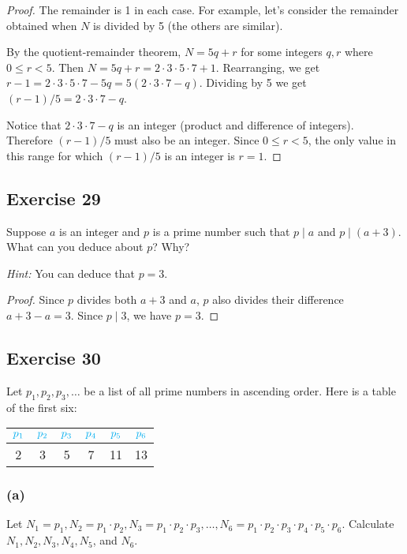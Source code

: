 \documentclass[14pt]{extarticle}
\newcommand{\cy}{\color{cyan}}
\begin{document}
\begin{proof}
The remainder is 1 in each case. For example, let's consider the remainder obtained when $N$ is divided by 5 (the others are similar). 

By the quotient-remainder theorem, $N = 5q+r$ for some integers $q,r$ where $0 \leq r < 5$. Then $N = 5q+r = 2\cdot3\cdot5\cdot7 + 1$. Rearranging, we get $r - 1 = 2\cdot3\cdot5\cdot7 - 5q = 5(2\cdot3\cdot7 - q)$. Dividing by 5 we get $(r-1)/5 = 2\cdot3\cdot7 - q$. 

Notice that $2\cdot3\cdot7 - q$ is an integer (product and difference of integers). Therefore $(r-1)/5$ must also be an integer. Since $0 \leq r < 5$, the only value in this range for which $(r-1)/5$ is an integer is $r = 1$.
\end{proof}

\subsection{Exercise 29}
Suppose $a$ is an integer and $p$ is a prime number such that $p \mid a$ and $p \mid (a + 3)$. What can you deduce
about $p$? Why?

{\it Hint:} You can deduce that $p = 3$.

\begin{proof}
Since $p$ divides both $a+3$ and $a$, $p$ also divides their difference $a+3 - a = 3$. Since $p \mid 3$, we have $p = 3$.
\end{proof}

\subsection{Exercise 30}
Let $p_1, p_2, p_3, \ldots$ be a list of all prime numbers in ascending order. Here is a table of the first six:

\begin{center}
\begin{tabular}{|c|c|c|c|c|c|}
\hline
$\cy p_1$ & $\cy p_2$ & $\cy p_3$ & $\cy p_4$ & $\cy p_5$ & $\cy p_6$\\
\hline
2 & 3 & 5 & 7 & 11 & 13 \\
\hline
\end{tabular}
\end{center}

\subsubsection{(a)}
Let $N_1 = p_1, N_2 = p_1 \cdot p_2, N_3 = p_1 \cdot p_2 \cdot p_3, \ldots, N_6 = p_1 \cdot p_2 \cdot p_3 \cdot p_4 \cdot p_5 \cdot p_6$. Calculate $N_1, N_2, N_3, N_4, N_5$, and $N_6$.
\end{document}

